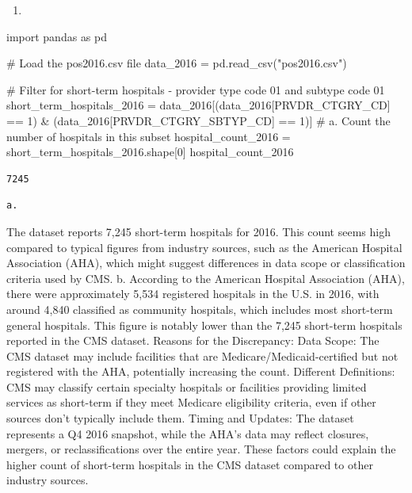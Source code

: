 \documentclass[
  letterpaper,
  DIV=11,
  numbers=noendperiod]{scrartcl}
\newenvironment{Shaded}{\begin{snugshade}}{\end{snugshade}}
\newcommand{\CommentTok}[1]{\textcolor[rgb]{0.37,0.37,0.37}{#1}}
\newcommand{\DecValTok}[1]{\textcolor[rgb]{0.68,0.00,0.00}{#1}}
\newcommand{\ImportTok}[1]{\textcolor[rgb]{0.00,0.46,0.62}{#1}}
\newcommand{\NormalTok}[1]{\textcolor[rgb]{0.00,0.23,0.31}{#1}}
\newcommand{\OperatorTok}[1]{\textcolor[rgb]{0.37,0.37,0.37}{#1}}
\newcommand{\StringTok}[1]{\textcolor[rgb]{0.13,0.47,0.30}{#1}}
\providecommand{\tightlist}{%
  \setlength{\itemsep}{0pt}\setlength{\parskip}{0pt}}\usepackage{longtable,booktabs,array}
\begin{document}
\begin{enumerate}
\def\labelenumi{\arabic{enumi}.}
\setcounter{enumi}{1}
\tightlist
\item
\end{enumerate}

\begin{Shaded}
\begin{Highlighting}[]
\ImportTok{import}\NormalTok{ pandas }\ImportTok{as}\NormalTok{ pd}

\CommentTok{\# Load the pos2016.csv file}
\NormalTok{data\_2016 }\OperatorTok{=}\NormalTok{ pd.read\_csv(}\StringTok{"pos2016.csv"}\NormalTok{)}

\CommentTok{\# Filter for short{-}term hospitals {-} provider type code 01 and subtype code 01}
\NormalTok{short\_term\_hospitals\_2016 }\OperatorTok{=}\NormalTok{ data\_2016[(data\_2016[}\StringTok{\textquotesingle{}PRVDR\_CTGRY\_CD\textquotesingle{}}\NormalTok{] }\OperatorTok{==} \DecValTok{1}\NormalTok{) }\OperatorTok{\&}\NormalTok{ (data\_2016[}\StringTok{\textquotesingle{}PRVDR\_CTGRY\_SBTYP\_CD\textquotesingle{}}\NormalTok{] }\OperatorTok{==} \DecValTok{1}\NormalTok{)]}
\CommentTok{\# a. Count the number of hospitals in this subset}
\NormalTok{hospital\_count\_2016 }\OperatorTok{=}\NormalTok{ short\_term\_hospitals\_2016.shape[}\DecValTok{0}\NormalTok{]}
\NormalTok{hospital\_count\_2016}
\end{Highlighting}
\end{Shaded}

\begin{verbatim}
7245
\end{verbatim}

\begin{verbatim}
a.
\end{verbatim}

The dataset reports 7,245 short-term hospitals for 2016. This count
seems high compared to typical figures from industry sources, such as
the American Hospital Association (AHA), which might suggest differences
in data scope or classification criteria used by CMS. b. According to
the American Hospital Association (AHA), there were approximately 5,534
registered hospitals in the U.S. in 2016, with around 4,840 classified
as community hospitals, which includes most short-term general
hospitals. This figure is notably lower than the 7,245 short-term
hospitals reported in the CMS dataset. Reasons for the Discrepancy: Data
Scope: The CMS dataset may include facilities that are
Medicare/Medicaid-certified but not registered with the AHA, potentially
increasing the count. Different Definitions: CMS may classify certain
specialty hospitals or facilities providing limited services as
short-term if they meet Medicare eligibility criteria, even if other
sources don't typically include them. Timing and Updates: The dataset
represents a Q4 2016 snapshot, while the AHA's data may reflect
closures, mergers, or reclassifications over the entire year. These
factors could explain the higher count of short-term hospitals in the
CMS dataset compared to other industry sources.
\end{document}
